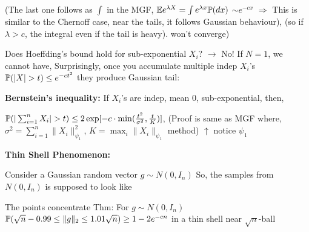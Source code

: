 \documentclass[12pt]{article}
\begin{document}
(The last one follows as $\int$ in the MGF, $\mathbb{E} e^{\lambda X} = \int e^{\lambda x} \mathbb{P}(dx)$
\hspace*{4cm} $\sim e^{-cx}$
$\Rightarrow$ This is similar to the Chernoff case,
near the tails, it follows Gaussian behaviour), (so if $\lambda > c$, the integral
even if the tail is heavy). \hspace*{4cm} won't converge)

Does Hoeffding's bound hold for sub-exponential $X_i$? $\longrightarrow$ No! If $N=1$, we cannot
\hspace*{6cm} have,
Surprisingly, once you accumulate multiple indep $X_i$'s \hspace*{1cm} $\mathbb{P}(|X| > t) \leq e^{-ct^2}$
they produce Gaussian tail:

\textbf{Bernstein's inequality:} If $X_i$'s are indep, mean 0, sub-exponential, then,

$\mathbb{P}(|\sum_{i=1}^n X_i| > t) \leq 2 \exp[-c \cdot \min(\frac{t^2}{\sigma^2}, \frac{t}{K})]$, \hspace*{1cm} (Proof is same
\hspace*{8cm} as MGF
where, $\sigma^2 = \sum_{i=1}^n \|X_i\|_{\psi_1}^2$, $K = \max_i \|X_i\|_{\psi_1}$ \hspace*{1cm} method)
\hspace*{1cm} $\uparrow$ notice $\psi_1$

\textbf{Thin Shell Phenomenon:}

Consider a Gaussian random vector $g \sim N(0, I_n)$
So, the samples from $N(0, I_n)$ is supposed to look like


\hspace*{8cm} The points
\hspace*{8cm} concentrate
Thm: For $g \sim N(0, I_n)$ $\mathbb{P}(\sqrt{n} - 0.99 \leq \|g\|_2 \leq 1.01 \sqrt{n}) \geq 1 - 2e^{-cn}$ \hspace*{0.5cm} in a thin shell
\hspace*{8cm} near $\sqrt{n}$-ball
\end{document}
